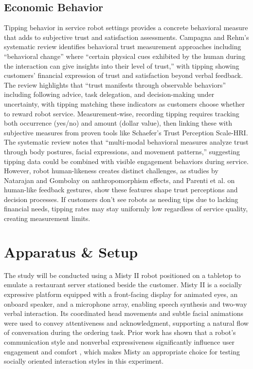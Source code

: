\documentclass[conference]{IEEEtran}
\begin{document}
\subsection{Economic Behavior}
Tipping behavior in service robot settings provides a concrete behavioral measure that adds to subjective trust and satisfaction assessments. Campagna and Rehm's systematic review identifies behavioral trust measurement approaches including ``behavioral change'' where ``certain physical cues exhibited by the human during the interaction can give insights into their level of trust,'' with tipping showing customers' financial expression of trust and satisfaction beyond verbal feedback. The review highlights that ``trust manifests through observable behaviors'' including following advice, task delegation, and decision-making under uncertainty, with tipping matching these indicators as customers choose whether to reward robot service. Measurement-wise, recording tipping requires tracking both occurrence (yes/no) and amount (dollar value), then linking these with subjective measures from proven tools like Schaefer's Trust Perception Scale-HRI. The systematic review notes that ``multi-modal behavioral measures analyze trust through body postures, facial expressions, and movement patterns,'' suggesting tipping data could be combined with visible engagement behaviors during service. However, robot human-likeness creates distinct challenges, as studies by Natarajan and Gombolay \cite{b22} on anthropomorphism effects, and Parenti et al. \cite{b23} on human-like feedback gestures, show these features shape trust perceptions and decision processes. If customers don't see robots as needing tips due to lacking financial needs, tipping rates may stay uniformly low regardless of service quality, creating measurement limits.


\section{Apparatus \& Setup}
\label{sec:apparatus_setup}
The study will be conducted using a Misty II robot positioned on a tabletop to emulate a restaurant server stationed beside the customer. Misty II is a socially expressive platform equipped with a front-facing display for animated eyes, an onboard speaker, and a microphone array, enabling speech synthesis and two-way verbal interaction. Its coordinated head movements and subtle facial animations were used to convey attentiveness and acknowledgment, supporting a natural flow of conversation during the ordering task. Prior work has shown that a robot's communication style and nonverbal expressiveness significantly influence user engagement and comfort \cite{b24}, which makes Misty an appropriate choice for testing socially oriented interaction styles in this experiment.
\end{document}
